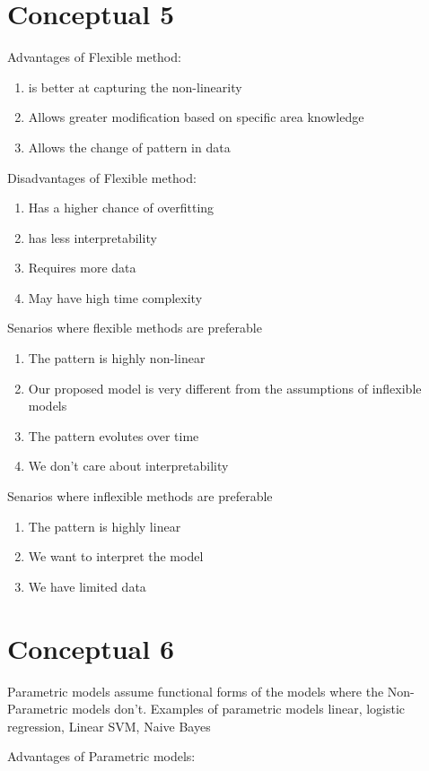 \documentclass{article}
\begin{document}
\newpage
\section*{Conceptual 5}

Advantages of Flexible method:
\begin{enumerate}
  \item is better at capturing the non-linearity
  \item  Allows greater modification based on specific area knowledge
  \item  Allows the change of pattern in data
\end{enumerate}
Disadvantages of Flexible method:
\begin{enumerate}
  \item  Has a higher chance of overfitting
  \item  has less interpretability
  \item  Requires more data
  \item  May have high time complexity
\end{enumerate}
Senarios where flexible methods are preferable

\begin{enumerate}
  \item The pattern is highly non-linear
  \item Our proposed model is very different from the assumptions of inflexible models
  \item The pattern evolutes over time
  \item We don't care about interpretability
\end{enumerate}
Senarios where inflexible methods are preferable
\begin{enumerate}
  \item The pattern is highly linear
  \item We want to interpret the model
  \item We have limited data
\end{enumerate}

\section*{Conceptual 6}

Parametric models assume functional forms of the models where the Non-Parametric models don't. Examples of parametric models linear, logistic regression, Linear SVM, Naive Bayes

\noindent
Advantages of Parametric models:
\end{document}
